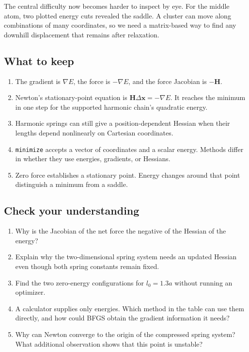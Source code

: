 \documentclass[
  11pt,
  letterpaper,
  DIV=11,
  numbers=noendperiod]{scrartcl}
\providecommand{\tightlist}{%
  \setlength{\itemsep}{0pt}\setlength{\parskip}{0pt}}
\begin{document}
The central difficulty now becomes harder to inspect by eye. For the
middle atom, two plotted energy cuts revealed the saddle. A cluster can
move along combinations of many coordinates, so we need a matrix-based
way to find any downhill displacement that remains after relaxation.

\subsection{What to keep}\label{what-to-keep}

\begin{enumerate}
\def\labelenumi{\arabic{enumi}.}
\tightlist
\item
  The gradient is \(\nabla E\), the force is \(-\nabla E\), and the
  force Jacobian is \(-\mathbf H\).
\item
  Newton's stationary-point equation is
  \(\mathbf H\Delta\mathbf x=-\nabla E\). It reaches the minimum in one
  step for the supported harmonic chain's quadratic energy.
\item
  Harmonic springs can still give a position-dependent Hessian when
  their lengths depend nonlinearly on Cartesian coordinates.
\item
  \texttt{minimize} accepts a vector of coordinates and a scalar energy.
  Methods differ in whether they use energies, gradients, or Hessians.
\item
  Zero force establishes a stationary point. Energy changes around that
  point distinguish a minimum from a saddle.
\end{enumerate}

\subsection{Check your understanding}\label{check-your-understanding}

\begin{enumerate}
\def\labelenumi{\arabic{enumi}.}
\tightlist
\item
  Why is the Jacobian of the net force the negative of the Hessian of
  the energy?
\item
  Explain why the two-dimensional spring system needs an updated Hessian
  even though both spring constants remain fixed.
\item
  Find the two zero-energy configurations for \(l_0=1.3a\) without
  running an optimizer.
\item
  A calculator supplies only energies. Which method in the table can use
  them directly, and how could BFGS obtain the gradient information it
  needs?
\item
  Why can Newton converge to the origin of the compressed spring system?
  What additional observation shows that this point is unstable?
\end{enumerate}
\end{document}
